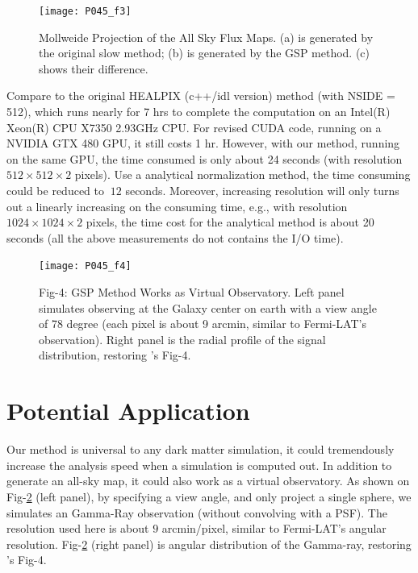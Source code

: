 \documentclass[11pt,twoside]{article}
\begin{document}
\begin{figure}[htb]
\begin{center}
 \texttt{[image: P045\_f3]}
\caption{Mollweide Projection of the All Sky Flux Maps. (a) is generated by the original slow method; (b) is generated by the GSP method. (c) shows their difference. \label{figcmp}}
\end{center}
\end{figure}

Compare to the original HEALPIX (c++/idl version) method (with NSIDE = 512), which runs nearly for 7 hrs to complete the computation on an Intel(R) Xeon(R) CPU X7350 2.93GHz CPU. For revised CUDA code, running on a NVIDIA GTX 480 GPU, it still costs 1 hr. However, with our method, running on the same GPU, the time consumed is only about 24 seconds (with resolution $512\times512\times2$ pixels). Use a analytical normalization method, the time consuming could be reduced to $~12$ seconds. Moreover, increasing resolution will only turns out a linearly increasing on the consuming time, e.g., with resolution $1024\times1024\times2$ pixels, the time cost for the analytical method is about 20 seconds (all the above measurements do not contains the I/O time). 

\begin{figure}[htb]
\begin{center}
 \texttt{[image: P045\_f4]}
\caption{Fig-4: GSP Method Works as Virtual Observatory. Left panel simulates observing at the Galaxy center on earth with a view angle of 78 degree (each pixel is about 9 arcmin, similar to Fermi-LAT’s observation). Right panel is the radial profile of the signal distribution, restoring \citet{Kuhlen:2008kr}'s Fig-4.  \label{figapp}}
\end{center}
\end{figure}

\section{Potential Application}
Our method is universal to any dark matter simulation, it could tremendously increase the analysis speed when a simulation is computed out. In addition to generate an all-sky map, it could also work as a virtual observatory. As shown on Fig-\ref{figapp} (left panel), by specifying a view angle, and only project a single sphere, we simulates an Gamma-Ray observation (without convolving with a PSF). The resolution used here is about $9$ arcmin/pixel, similar to Fermi-LAT's angular resolution. Fig-\ref{figapp} (right panel) is angular distribution of the Gamma-ray, restoring \citet{Kuhlen:2008kr}'s Fig-4. 
\end{document}
